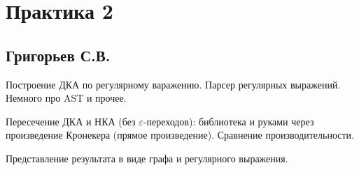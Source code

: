 \section{Практика 2}

\subsection{Григорьев С.В.}

Построение ДКА по регулярному варажению.
Парсер регулярных выражений. Немного про AST и прочее.

Пересечение ДКА и НКА (без $\varepsilon$-переходов): библиотека и руками через произведение Кронекера (прямое произведение). Сравнение производительности.

Представление результата в виде графа и регулярного выражения.





